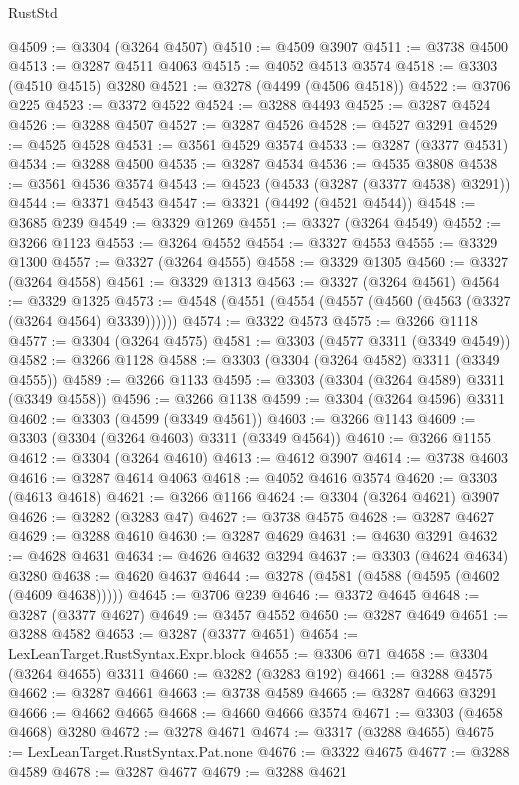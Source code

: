 \begin{lexlean}{RustStd}
\begin{coremodule}
@4509 := @3304 (@3264 @4507)
@4510 := @4509 @3907
@4511 := @3738 @4500
@4513 := @3287 @4511 @4063
@4515 := @4052 @4513 @3574
@4518 := @3303 (@4510 @4515) @3280
@4521 := @3278 (@4499 (@4506 @4518))
@4522 := @3706 @225
@4523 := @3372 @4522
@4524 := @3288 @4493
@4525 := @3287 @4524
@4526 := @3288 @4507
@4527 := @3287 @4526
@4528 := @4527 @3291
@4529 := @4525 @4528
@4531 := @3561 @4529 @3574
@4533 := @3287 (@3377 @4531)
@4534 := @3288 @4500
@4535 := @3287 @4534
@4536 := @4535 @3808
@4538 := @3561 @4536 @3574
@4543 := @4523 (@4533 (@3287 (@3377 @4538) @3291))
@4544 := @3371 @4543
@4547 := @3321 (@4492 (@4521 @4544))
@4548 := @3685 @239
@4549 := @3329 @1269
@4551 := @3327 (@3264 @4549)
@4552 := @3266 @1123
@4553 := @3264 @4552
@4554 := @3327 @4553
@4555 := @3329 @1300
@4557 := @3327 (@3264 @4555)
@4558 := @3329 @1305
@4560 := @3327 (@3264 @4558)
@4561 := @3329 @1313
@4563 := @3327 (@3264 @4561)
@4564 := @3329 @1325
@4573 := @4548 (@4551 (@4554 (@4557 (@4560 (@4563 (@3327 (@3264 @4564) @3339))))))
@4574 := @3322 @4573
@4575 := @3266 @1118
@4577 := @3304 (@3264 @4575)
@4581 := @3303 (@4577 @3311 (@3349 @4549))
@4582 := @3266 @1128
@4588 := @3303 (@3304 (@3264 @4582) @3311 (@3349 @4555))
@4589 := @3266 @1133
@4595 := @3303 (@3304 (@3264 @4589) @3311 (@3349 @4558))
@4596 := @3266 @1138
@4599 := @3304 (@3264 @4596) @3311
@4602 := @3303 (@4599 (@3349 @4561))
@4603 := @3266 @1143
@4609 := @3303 (@3304 (@3264 @4603) @3311 (@3349 @4564))
@4610 := @3266 @1155
@4612 := @3304 (@3264 @4610)
@4613 := @4612 @3907
@4614 := @3738 @4603
@4616 := @3287 @4614 @4063
@4618 := @4052 @4616 @3574
@4620 := @3303 (@4613 @4618)
@4621 := @3266 @1166
@4624 := @3304 (@3264 @4621) @3907
@4626 := @3282 (@3283 @47)
@4627 := @3738 @4575
@4628 := @3287 @4627
@4629 := @3288 @4610
@4630 := @3287 @4629
@4631 := @4630 @3291
@4632 := @4628 @4631
@4634 := @4626 @4632 @3294
@4637 := @3303 (@4624 @4634) @3280
@4638 := @4620 @4637
@4644 := @3278 (@4581 (@4588 (@4595 (@4602 (@4609 @4638)))))
@4645 := @3706 @239
@4646 := @3372 @4645
@4648 := @3287 (@3377 @4627)
@4649 := @3457 @4552
@4650 := @3287 @4649
@4651 := @3288 @4582
@4653 := @3287 (@3377 @4651)
@4654 := LexLeanTarget.RustSyntax.Expr.block
@4655 := @3306 @71
@4658 := @3304 (@3264 @4655) @3311
@4660 := @3282 (@3283 @192)
@4661 := @3288 @4575
@4662 := @3287 @4661
@4663 := @3738 @4589
@4665 := @3287 @4663 @3291
@4666 := @4662 @4665
@4668 := @4660 @4666 @3574
@4671 := @3303 (@4658 @4668) @3280
@4672 := @3278 @4671
@4674 := @3317 (@3288 @4655)
@4675 := LexLeanTarget.RustSyntax.Pat.none
@4676 := @3322 @4675
@4677 := @3288 @4589
@4678 := @3287 @4677
@4679 := @3288 @4621

\end{coremodule}
\end{lexlean}
